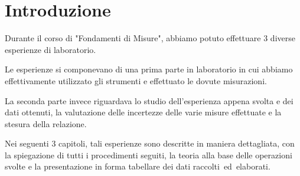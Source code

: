 \chapter{Introduzione}
\label{chap:introduction}

Durante il corso di "Fondamenti di Misure", abbiamo potuto effettuare 3 diverse esperienze di laboratorio.

\vspace{5mm}
Le esperienze si componevano di una prima parte in laboratorio in cui abbiamo effettivamente utilizzato gli strumenti e effettuato le dovute misurazioni.

La seconda parte invece riguardava lo studio dell'esperienza appena svolta e dei dati ottenuti, la valutazione delle incertezze delle varie misure effettuate e la stesura della relazione.

\vspace{5mm}

Nei seguenti 3 capitoli, tali esperienze sono descritte in maniera dettagliata, con la spiegazione di tutti i procedimenti seguiti, la teoria alla base delle operazioni svolte e la presentazione in forma tabellare dei dati raccolti ed elaborati.